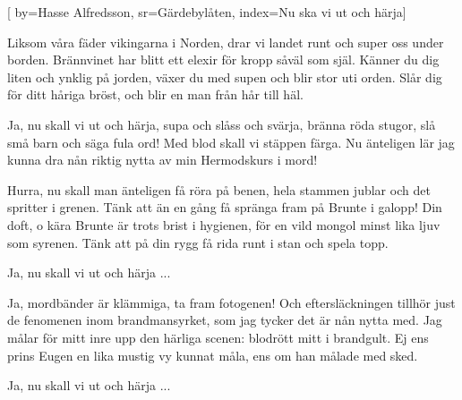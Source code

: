 [ 	
    by={Hasse Alfredsson},						
	sr={Gärdebylåten},					
	index={Nu ska vi ut och härja}]		

\beginverse*
Liksom våra fäder vikingarna i Norden,
drar vi landet runt och super oss under borden.
Brännvinet har blitt ett elexir 
för kropp såväl som själ.
Känner du dig liten och ynklig på jorden,
växer du med supen och blir stor uti orden.
Slår dig för ditt håriga bröst,
och blir en man från hår till häl.
\endverse

\beginchorus				
Ja, nu skall vi ut och härja,
supa och slåss och svärja,
bränna röda stugor, slå små barn
 och säga fula ord!
Med blod skall vi stäppen färga.
Nu änteligen lär jag
kunna dra nån riktig nytta av
min Hermodskurs i mord! 
\endchorus	

\beginverse					
Hurra, nu skall man änteligen få röra på benen,
hela stammen jublar och det spritter i grenen.
Tänk att än en gång få spränga fram
 på Brunte i galopp!
Din doft, o kära Brunte är trots brist i hygienen,
för en vild mongol minst lika ljuv som syrenen.
Tänk att på din rygg få rida runt
 i stan och spela topp. 
\endverse						

\beginchorus				
Ja, nu skall vi ut och härja ...
\endchorus	

\beginverse
Ja, mordbänder är klämmiga, ta fram fotogenen!
Och eftersläckningen tillhör just de fenomenen
inom brandmansyrket, som jag tycker 
det är nån nytta med.
Jag målar för mitt inre upp den härliga scenen: 
blodrött mitt i brandgult. Ej ens prins Eugen en
lika mustig vy kunnat måla, 
ens om han målade med sked. 
\endverse	

\beginchorus	
Ja, nu skall vi ut och härja ... 
\endchorus	
\endsong
